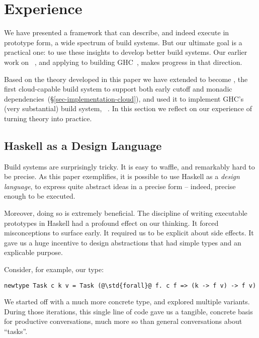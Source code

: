 \section{Experience}\label{sec-experience}

We have presented a framework that can describe, and indeed execute in
prototype form, a wide spectrum of build systems.  But our ultimate
goal is a practical one: to use these insights to develop better
build systems. Our earlier work on \Shake~\cite{mitchell2012shake}, and applying
\Shake to building GHC~\cite{hadrian}, makes progress in that direction.

Based on the theory developed in this paper we have extended \Shake to
become \Cloud \Shake, the first cloud-capable build system to support
both early cutoff and monadic dependencies~(\S\ref{sec-implementation-cloud}),
and used it to implement GHC's (very substantial) build system,
\Hadrian~\cite{hadrian}. In this section we reflect on our experience of turning
theory into practice.

\vspace{-1mm}
\subsection{Haskell as a Design Language}\label{sec-design-lang}

Build systems are surprisingly tricky.  It is easy to waffle, and
remarkably hard to be precise. As this paper exemplifies, it is
possible to use Haskell as a \emph{design language}, to express quite
abstract ideas in a precise form -- indeed, precise enough to be executed.

Moreover, doing so is extremely beneficial.
The discipline of writing executable prototypes in
Haskell had a profound effect on our thinking. It forced misconceptions
to surface early.  It required us to be explicit about side effects.
It gave us a huge incentive to design abstractions that had simple types
and an explicable purpose.

Consider, for example, our  type:
\begin{verbatim}
newtype Task c k v = Task (@\std{forall}@ f. c f => (k -> f v) -> f v)
\end{verbatim}
We started off with a much more concrete type, and explored
multiple variants.  During those iterations, this single line of
code gave us a tangible, concrete basis for productive conversations,
much more so than general conversations about ``tasks''.

